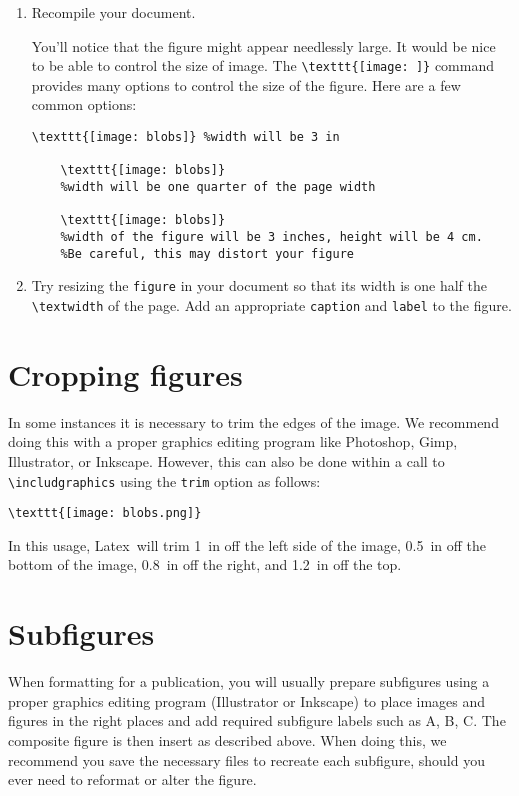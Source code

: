 \documentclass[10pt]{article}
\renewcommand{\LaTeX}{Latex}
\begin{document}
\begin{enumerate}
\item Recompile your document.

  You'll notice that the figure might appear needlessly large. It would be nice to be able to control the size of image. The \lstinline$\texttt{[image: ]}$ command provides many options to control the size of the figure. Here are a few common options:
  \begin{lstlisting}[basicstyle=\ttfamily\footnotesize]
    \texttt{[image: blobs]} %width will be 3 in
    
    \texttt{[image: blobs]}
    %width will be one quarter of the page width

    \texttt{[image: blobs]}
    %width of the figure will be 3 inches, height will be 4 cm.
    %Be careful, this may distort your figure
  \end{lstlisting}

\item Try resizing the \lstinline{figure} in your document so that its width is one half the \lstinline{\textwidth} of the page. Add an appropriate \lstinline{caption} and \lstinline{label} to the figure.
\end{enumerate}
  
  
\section{Cropping figures}
In some instances it is necessary to trim the edges of the image. We recommend doing this with a proper graphics editing program like Photoshop, Gimp, Illustrator, or Inkscape. However, this can also be done within a call to \lstinline$\includgraphics$ using the \lstinline{trim} option as follows:
\begin{lstlisting}[basicstyle=\ttfamily\footnotesize]
\texttt{[image: blobs.png]}
\end{lstlisting}

In this usage, \LaTeX\ will trim \SI{1}{in} off the left side of the image, \SI{0.5}{in} off the bottom of the image, \SI{0.8}{in} off the right, and \SI{1.2}{in} off the top.



\clearpage
\section{Subfigures}
When formatting for a publication, you will usually prepare subfigures using a proper graphics editing program (Illustrator or Inkscape) to place images and figures in the right places and add required subfigure labels such as A, B, C. The composite figure is then insert as described above. When doing this, we recommend you save the necessary files to recreate each subfigure, should you ever need to reformat or alter the figure.  
\end{document}
